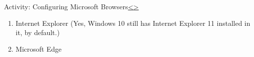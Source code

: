 \documentclass[12pt]{extarticle}
\newenvironment{instructionblock}{\Large\bgroup}{\egroup}
\newcommand{\ben}{\begin{enumerate}}
\newcommand{\een}{\end{enumerate}}
\begin{document}


	
	\pagebreak
	\begin{slide}{Activity: Configuring Microsoft Browsers}{\hyperref[slide 14]{\textless}\hyperref[slide 16]{\textgreater}}
		\begin{instructionblock}
			\ben 
			\item Internet Explorer {\small{(Yes, Windows 10 still has Internet Explorer 11 installed in it, by default.)}} 
			\item Microsoft Edge
			\een
		\end{instructionblock}
	\end{slide}
	\vfill
	
\end{document}
